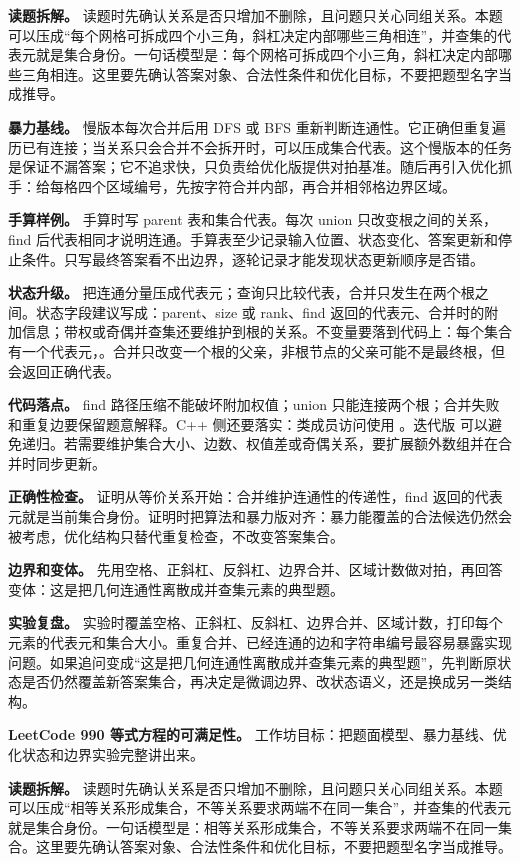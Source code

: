 \textbf{读题拆解。} 读题时先确认关系是否只增加不删除，且问题只关心同组关系。本题可以压成“每个网格可拆成四个小三角，斜杠决定内部哪些三角相连”，并查集的代表元就是集合身份。一句话模型是：每个网格可拆成四个小三角，斜杠决定内部哪些三角相连。这里要先确认答案对象、合法性条件和优化目标，不要把题型名字当成推导。

\textbf{暴力基线。} 慢版本每次合并后用 DFS 或 BFS 重新判断连通性。它正确但重复遍历已有连接；当关系只会合并不会拆开时，可以压成集合代表。这个慢版本的任务是保证不漏答案；它不追求快，只负责给优化版提供对拍基准。随后再引入优化抓手：给每格四个区域编号，先按字符合并内部，再合并相邻格边界区域。

\textbf{手算样例。} 手算时写 parent 表和集合代表。每次 union 只改变根之间的关系，find 后代表相同才说明连通。手算表至少记录输入位置、状态变化、答案更新和停止条件。只写最终答案看不出边界，逐轮记录才能发现状态更新顺序是否错。

\textbf{状态升级。} 把连通分量压成代表元；查询只比较代表，合并只发生在两个根之间。状态字段建议写成：parent、size 或 rank、find 返回的代表元、合并时的附加信息；带权或奇偶并查集还要维护到根的关系。不变量要落到代码上：每个集合有一个代表元，。合并只改变一个根的父亲，非根节点的父亲可能不是最终根，但  会返回正确代表。

\textbf{代码落点。} find 路径压缩不能破坏附加权值；union 只能连接两个根；合并失败和重复边要保留题意解释。C++ 侧还要落实：类成员访问使用 。迭代版  可以避免递归。若需要维护集合大小、边数、权值差或奇偶关系，要扩展额外数组并在合并时同步更新。

\textbf{正确性检查。} 证明从等价关系开始：合并维护连通性的传递性，find 返回的代表元就是当前集合身份。证明时把算法和暴力版对齐：暴力能覆盖的合法候选仍然会被考虑，优化结构只替代重复检查，不改变答案集合。

\textbf{边界和变体。} 先用空格、正斜杠、反斜杠、边界合并、区域计数做对拍，再回答变体：这是把几何连通性离散成并查集元素的典型题。

\textbf{实验复盘。} 实验时覆盖空格、正斜杠、反斜杠、边界合并、区域计数，打印每个元素的代表元和集合大小。重复合并、已经连通的边和字符串编号最容易暴露实现问题。如果追问变成“这是把几何连通性离散成并查集元素的典型题”，先判断原状态是否仍然覆盖新答案集合，再决定是微调边界、改状态语义，还是换成另一类结构。

\noindent\textbf{LeetCode 990 等式方程的可满足性。} 工作坊目标：把题面模型、暴力基线、优化状态和边界实验完整讲出来。

\textbf{读题拆解。} 读题时先确认关系是否只增加不删除，且问题只关心同组关系。本题可以压成“相等关系形成集合，不等关系要求两端不在同一集合”，并查集的代表元就是集合身份。一句话模型是：相等关系形成集合，不等关系要求两端不在同一集合。这里要先确认答案对象、合法性条件和优化目标，不要把题型名字当成推导。

